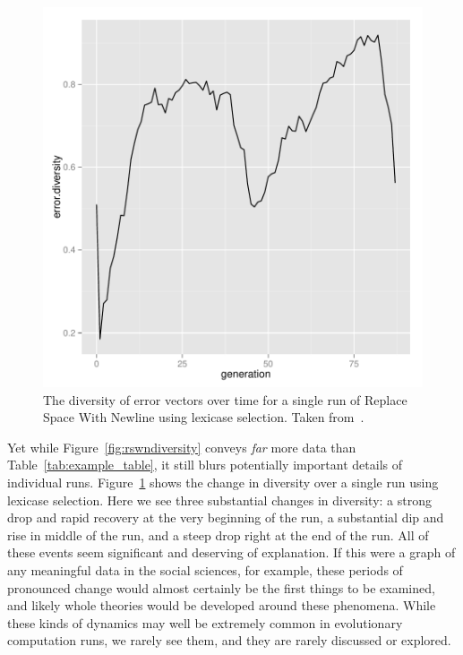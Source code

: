 \begin{figure}
	\includegraphics[width=0.7\linewidth]{Figures/run6_lexicase_rswn_diversity}
	\caption{The diversity of error vectors over time for a single run of
	Replace Space With Newline using lexicase selection. Taken from~\cite{diversity_gecco}.}
	\label{fig:run6lexicaserswndiversity}
\end{figure}

Yet while Figure~\ref{fig:rswndiversity} conveys \emph{far} more data
than Table~\ref{tab:example_table}, it still blurs potentially important
details of individual runs. Figure~\ref{fig:run6lexicaserswndiversity} shows
the change in diversity over a single run using lexicase selection. Here we 
see three substantial changes in diversity: a strong drop and rapid recovery
at the very beginning of the run, a substantial dip and rise in middle of the run, and a steep drop right at the end of the run. All of these events seem
significant and deserving of explanation. If this were a graph of any meaningful data in the social sciences, for example, these periods of
pronounced change would almost certainly be the first things to be
examined, and likely whole theories would be developed around these
phenomena. While these kinds of dynamics may well be extremely 
common in evolutionary computation runs, we rarely see them, and they
are rarely discussed or explored.


